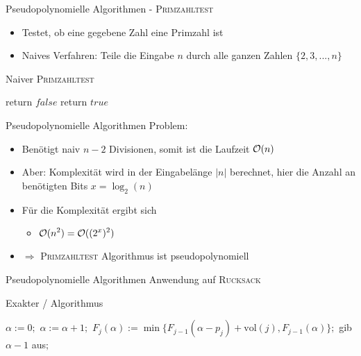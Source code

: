 \begin{frame}{Pseudopolynomielle Algorithmen - \textsc{Primzahltest}}
	\begin{itemize}
		\item Testet, ob eine gegebene Zahl eine Primzahl ist
		\item Naives Verfahren: Teile die Eingabe $n$ durch alle ganzen Zahlen $\{2,3,...,n\}$
	\end{itemize}
	
	\begin{algorithm}[H]
		\caption{Naiver \textsc{Primzahltest}}
		\begin{algorithmic}
			\State return $false$
			\EndIf
			\EndFor
			\State return $true$
			\EndFunction
		\end{algorithmic}
	\end{algorithm}
\end{frame}

\begin{frame}{Pseudopolynomielle Algorithmen}
	Problem:
	
	\begin{itemize}
		\item Benötigt naiv $n-2$ Divisionen, somit ist die Laufzeit $\mathcal{O}(n)$ 
		\item Aber: Komplexität wird in der Eingabelänge $|n|$ berechnet, hier die Anzahl an benötigten Bits $x = \log_2(n)$ 
		\item Für die Komplexität ergibt sich
		\begin{itemize}
			\item $\displaystyle \mathcal{O}(n^2) = \mathcal{O}((2^x)^2)$
		\end{itemize}
		\item $\Rightarrow$ \textsc{Primzahltest} Algorithmus ist pseudopolynomiell
	\end{itemize}
\end{frame}

\begin{frame}{Pseudopolynomielle Algorithmen}
Anwendung auf \textsc{Rucksack}
\newline

\begin{algorithm}[H]
    \caption{Exakter \rucksack/ Algorithmus}
        \begin{algorithmic}
            \State $\alpha:=0;$
            \Repeat
            \State $\alpha:=\alpha+1;$
            \State $F_j(\alpha):=\min\{F_{j-1}(\alpha-p_j)+\text{vol}(j),F_{j-1}(\alpha)\};$
            \EndFor
            \State gib $\alpha-1$ aus$;$
        \end{algorithmic}
\end{algorithm}

\end{frame}

